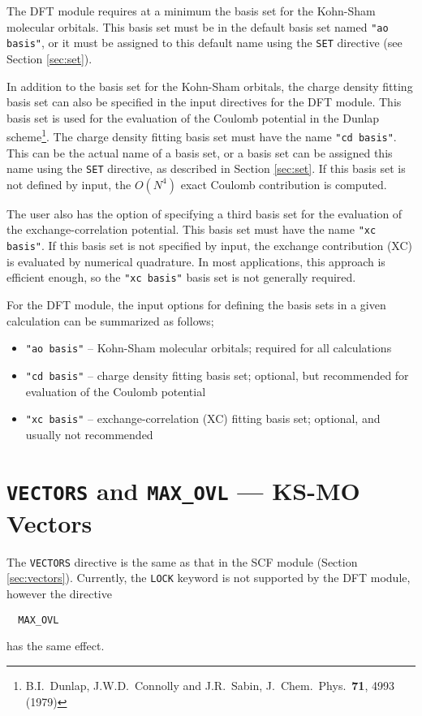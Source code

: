 The DFT module requires at a minimum the basis set for the Kohn-Sham 
molecular orbitals.  This basis set must be in the default basis set named
{\tt "ao basis"}, or it must be assigned to this default name using the
\verb+SET+ directive (see Section \ref{sec:set}).

In addition to the basis set for the Kohn-Sham orbitals, 
the charge density fitting basis set can also be specified in the 
input directives for the DFT module.  This basis set is used for the 
evaluation of the Coulomb potential in the Dunlap scheme\footnote{B.I.~Dunlap, 
J.W.D.~Connolly and J.R.~Sabin, J.~Chem.~Phys.~{\bf 71},  4993 (1979)}.
The charge density fitting basis set must have the name {\tt "cd basis"}.
This can be the actual name of a basis set, or a basis set can be 
assigned this name using the \verb+SET+ directive, as described in
Section \ref{sec:set}.  If this basis set is not defined by input,
the $O(N^4)$ exact Coulomb contribution is computed.

The user also has the option of specifying a third basis set for the 
evaluation of the exchange-correlation potential.  This basis set must
have the name {\tt "xc basis"}.  If this basis set is not specified
by input, the exchange contribution (XC) is evaluated by numerical
quadrature.  In most applications, this approach is efficient enough,
so the {\tt "xc basis"} basis set is not generally required.

For the DFT module, the input options for defining the basis sets in a given
calculation can be summarized as follows;
\begin{itemize}
\item {\tt "ao basis"} -- Kohn-Sham molecular orbitals; required for all 
calculations
\item {\tt "cd basis"} -- charge density fitting basis set; optional, but
recommended for evaluation of the Coulomb potential
\item {\tt "xc basis"} -- exchange-correlation (XC) fitting basis set; 
optional, and usually not recommended
\end{itemize}


\section{{\tt VECTORS} and {\tt MAX\_OVL} --- KS-MO Vectors}

The \verb+VECTORS+ directive is the same as that in the SCF module
(Section \ref{sec:vectors}).  Currently, the \verb+LOCK+ keyword
is not supported by the DFT module, however the directive
\begin{verbatim}
  MAX_OVL
\end{verbatim}
has the same effect.


